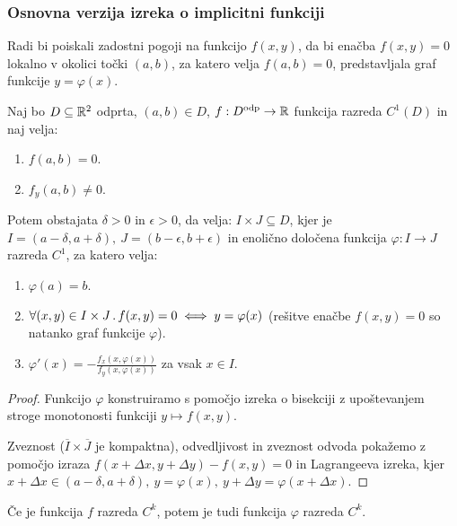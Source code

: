 \subsubsection{Osnovna verzija izreka o implicitni funkciji}
Radi bi poiskali zadostni pogoji na funkcijo $f(x, y)$, da bi enačba $f(x, y) = 0$ lokalno v okolici točki $(a,b)$, za katero velja $f(a,b) = 0$, predstavljala graf funkcije $y = \varphi(x)$.

\begin{izrek}
    Naj bo $D \subseteq \mathbb{R}^2$ odprta,  $(a, b) \in D$,  $f: D^\text{odp} \to \mathbb{R}$ funkcija razreda $ C^1(D)$ in naj velja:
    \begin{enumerate}
        \item $f(a,b) = 0$.
        \item $f_y(a,b) \neq 0$.
    \end{enumerate}
    Potem obstajata $\delta > 0$ in $\epsilon > 0$, da velja: $I \times J \subseteq D$, kjer je $I = (a - \delta, a + \delta), \ J = (b-\epsilon, b+\epsilon)$ in enolično določena funkcija $\varphi: I \to J$ razreda $C^1$, za katero velja:
    \begin{enumerate}
        \item $\varphi(a) = b$.
        \item $\forall (x,y) \in I \times J \,.\, f(x, y) = 0 \iff y = \varphi (x)$ (rešitve enačbe $f(x,y) = 0$ so natanko graf funkcije $\varphi$).
        \item $\varphi'(x) = -\frac{f_x(x, \varphi(x))}{f_y(x, \varphi(x))}$ za vsak $x \in I$.
    \end{enumerate}
\end{izrek}

\begin{proof}
    Funkcijo $\varphi$ konstruiramo s pomočjo izreka o bisekciji z upoštevanjem stroge monotonosti funkciji $y \mapsto f(x, y)$.

    Zveznost ($\overline{I} \times \overline{J}$ je kompaktna), odvedljivost in zveznost odvoda pokažemo z pomočjo izraza $f(x + \Delta x, y + \Delta y) - f(x,y) = 0$ in Lagrangeeva izreka, kjer $x + \Delta x \in (a - \delta, a + \delta), \ y= \varphi (x), \ y + \Delta y = \varphi(x + \Delta x)$.
\end{proof}

\begin{posledica}
    Če je funkcija $f$ razreda $C^k$, potem je tudi funkcija $\varphi$ razreda $C^k$.
\end{posledica}

